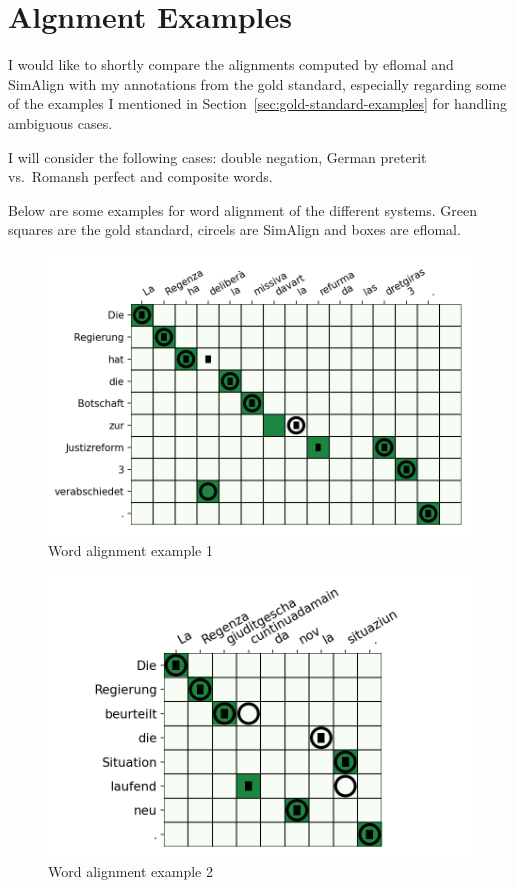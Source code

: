 \chapter{Algnment Examples}\label{appendix-a}

I would like to shortly compare the  alignments computed by eflomal and SimAlign with my annotations from the gold standard, especially regarding some of the examples I mentioned in Section~\ref{sec:gold-standard-examples} for handling ambiguous cases.

I will consider the following cases: double negation, German preterit vs.~Romansh perfect and composite words.



Below are some examples for word alignment of the different systems. 
Green squares are the gold standard, circels are SimAlign and boxes are eflomal.

\begin{figure}[ht]
\includegraphics{graphics/alignments/example1.png}
\caption{Word alignment example 1}
\end{figure}

\begin{figure}[ht]
\includegraphics{graphics/alignments/example2.png}
\caption{Word alignment example 2}
\end{figure}

